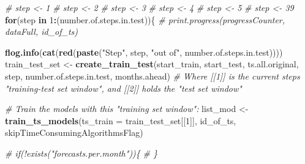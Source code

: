 \documentclass[
]{article}
\newenvironment{Shaded}{\begin{snugshade}}{\end{snugshade}}
\newcommand{\AttributeTok}[1]{\textcolor[rgb]{0.13,0.29,0.53}{#1}}
\newcommand{\CommentTok}[1]{\textcolor[rgb]{0.56,0.35,0.01}{\textit{#1}}}
\newcommand{\ControlFlowTok}[1]{\textcolor[rgb]{0.13,0.29,0.53}{\textbf{#1}}}
\newcommand{\DecValTok}[1]{\textcolor[rgb]{0.00,0.00,0.81}{#1}}
\newcommand{\FunctionTok}[1]{\textcolor[rgb]{0.13,0.29,0.53}{\textbf{#1}}}
\newcommand{\NormalTok}[1]{#1}
\newcommand{\OtherTok}[1]{\textcolor[rgb]{0.56,0.35,0.01}{#1}}
\newcommand{\SpecialCharTok}[1]{\textcolor[rgb]{0.81,0.36,0.00}{\textbf{#1}}}
\newcommand{\StringTok}[1]{\textcolor[rgb]{0.31,0.60,0.02}{#1}}
\begin{document}
\begin{Shaded}
\begin{Highlighting}[]
  \CommentTok{\# step \textless{}{-} 1}
  \CommentTok{\# step \textless{}{-} 2}
  \CommentTok{\# step \textless{}{-} 3}
  \CommentTok{\# step \textless{}{-} 4}
  \CommentTok{\# step \textless{}{-} 5}
  \CommentTok{\# step \textless{}{-} 39}
  \ControlFlowTok{for}\NormalTok{(step }\ControlFlowTok{in} \DecValTok{1}\SpecialCharTok{:}\NormalTok{(number.of.steps.in.test))\{}
    \CommentTok{\# print.progress(progressCounter, dataFull, id\_of\_ts)}

    \FunctionTok{flog.info}\NormalTok{(}\FunctionTok{cat}\NormalTok{(}\FunctionTok{red}\NormalTok{(}\FunctionTok{paste}\NormalTok{(}\StringTok{"Step"}\NormalTok{, step, }\StringTok{"out of"}\NormalTok{, number.of.steps.in.test))))}
\NormalTok{    train\_test\_set }\OtherTok{\textless{}{-}} \FunctionTok{create\_train\_test}\NormalTok{(start\_train, start\_test, ts.all.original, step, number.of.steps.in.test, months.ahead) }\CommentTok{\# Where [[1]] is the current step\textquotesingle{}s "training{-}test set window", and [[2]] holds the "test set window"}

    \CommentTok{\# Train the models with this "training set window":}
\NormalTok{    list\_mod }\OtherTok{\textless{}{-}} \FunctionTok{train\_ts\_models}\NormalTok{(}\AttributeTok{ts\_train =}\NormalTok{ train\_test\_set[[}\DecValTok{1}\NormalTok{]], id\_of\_ts, skipTimeConsumingAlgorithmsFlag)}

    \CommentTok{\# if(!exists("forecasts.per.month"))\{}
    \CommentTok{\# \}}


\end{Highlighting}
\end{Shaded}
\end{document}
